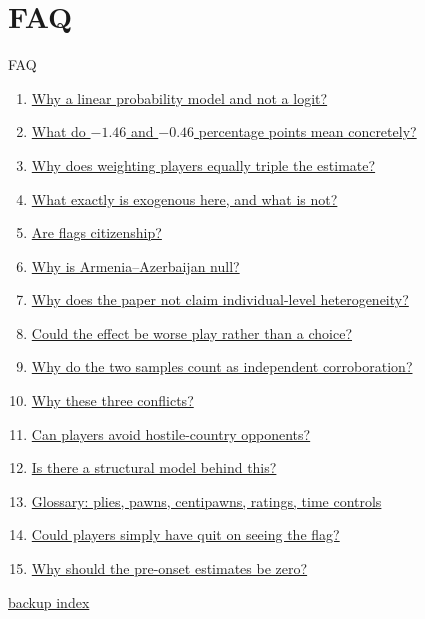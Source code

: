 \documentclass[aspectratio=169,11pt,t]{beamer}
\newcommand{\links}[1]{\vfill\hfill{#1}}
\begin{document}
\section{FAQ}

\begin{frame}[label=faq-index]{FAQ}
  \footnotesize
  \begin{enumerate}
    \item \hyperlink{faq-lpm}{Why a linear probability model and not a logit?}
    \item \hyperlink{faq-magnitude}{What do $-1.46$ and $-0.46$ percentage points mean concretely?}
    \item \hyperlink{faq-weighting}{Why does weighting players equally triple the estimate?}
    \item \hyperlink{faq-exogenous}{What exactly is exogenous here, and what is not?}
    \item \hyperlink{faq-flags}{Are flags citizenship?}
    \item \hyperlink{faq-aa}{Why is Armenia--Azerbaijan null?}
    \item \hyperlink{faq-heterogeneity}{Why does the paper not claim individual-level heterogeneity?}
    \item \hyperlink{faq-worseplay}{Could the effect be worse play rather than a choice?}
    \item \hyperlink{faq-independent}{Why do the two samples count as independent corroboration?}
    \item \hyperlink{faq-conflicts}{Why these three conflicts?}
    \item \hyperlink{faq-avoid}{Can players avoid hostile-country opponents?}
    \item \hyperlink{faq-structural}{Is there a structural model behind this?}
    \item \hyperlink{faq-glossary}{Glossary: plies, pawns, centipawns, ratings, time controls}
    \item \hyperlink{faq-quit}{Could players simply have quit on seeing the flag?}
    \item \hyperlink{faq-pretrends}{Why should the pre-onset estimates be zero?}
  \end{enumerate}
  \links{\hyperlink{backup-index}{\textcolor{linkblue}{\scriptsize\textsf{backup index}}}}
\end{frame}
\end{document}
